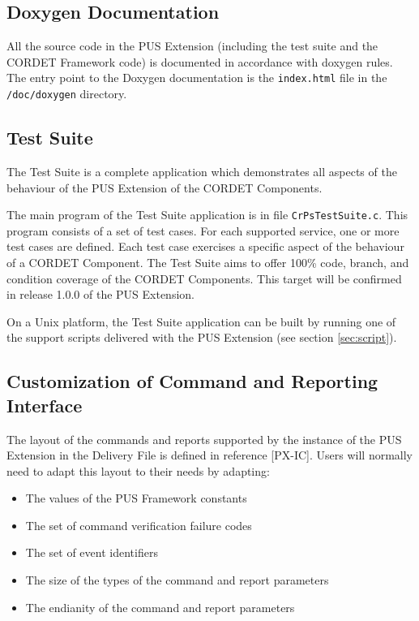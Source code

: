 \documentclass{pnp_article}
\begin{document}
\subsection{Doxygen Documentation}\label{sec:DoxygenDoc}
All the source code in the PUS Extension (including the test suite and the CORDET Framework code) is documented in accordance with doxygen rules. The entry point to the Doxygen documentation is the \texttt{index.html} file in the \texttt{/doc/doxygen} directory.

\subsection{Test Suite}\label{sec:TestSuite}
The Test Suite is a complete application which demonstrates all aspects of the behaviour of the PUS Extension of the CORDET Components.

The main program of the Test Suite application is in file \texttt{CrPsTestSuite.c}. This program consists of a set of test cases. For each supported service, one or more test cases are defined. Each test case exercises a specific aspect of the behaviour of a CORDET Component. The Test Suite aims to offer 100\% code, branch, and condition coverage of the CORDET Components. This target will be confirmed in release 1.0.0 of the PUS Extension.

On a Unix platform, the Test Suite application can be built by running one of the support scripts delivered with the PUS Extension (see section \ref{sec:script}). 

\subsection{Customization of Command and Reporting Interface}\label{sec:cmdRepIf}

The layout of the commands and reports supported by the instance of the PUS Extension in the Delivery File is defined in reference [PX-IC]. Users will normally need to adapt this layout to their needs by adapting:

\begin{itemize}
\item The values of the PUS Framework constants
\item The set of command verification failure codes
\item The set of event identifiers
\item The size of the types of the command and report parameters
\item The endianity of the command and report parameters
\end{itemize}
\end{document}
